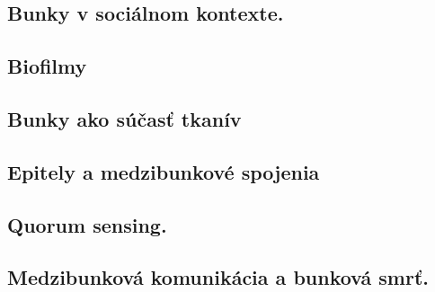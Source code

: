 \subsection{Bunky v sociálnom kontexte.}

\subsection{Biofilmy}

\subsection{Bunky ako súčasť tkanív}

\subsection{Epitely a medzibunkové spojenia}

\subsection{Quorum sensing.}

\subsection{Medzibunková komunikácia a bunková smrť.}

